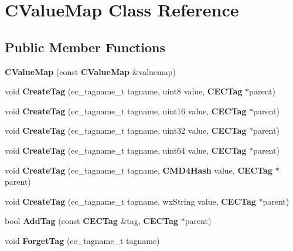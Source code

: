 \section{CValueMap Class Reference}
\label{classCValueMap}
\subsection*{Public Member Functions}
\begin{DoxyCompactItemize}
\item 
{\bfseries CValueMap} (const {\bf CValueMap} \&valuemap)\label{classCValueMap_a001e70fe2c75eee63fba998debaddc21}

\item 
void {\bfseries CreateTag} (ec\_\-tagname\_\-t tagname, uint8 value, {\bf CECTag} $\ast$parent)\label{classCValueMap_ad7d858c4427813ae2088acd160917ce2}

\item 
void {\bfseries CreateTag} (ec\_\-tagname\_\-t tagname, uint16 value, {\bf CECTag} $\ast$parent)\label{classCValueMap_a2baf08efd31561cd771116627cb2db02}

\item 
void {\bfseries CreateTag} (ec\_\-tagname\_\-t tagname, uint32 value, {\bf CECTag} $\ast$parent)\label{classCValueMap_ac12f2af93861153037357a6e6f6653bc}

\item 
void {\bfseries CreateTag} (ec\_\-tagname\_\-t tagname, uint64 value, {\bf CECTag} $\ast$parent)\label{classCValueMap_a8447adaf142d4ab9a6092538a080fc99}

\item 
void {\bfseries CreateTag} (ec\_\-tagname\_\-t tagname, {\bf CMD4Hash} value, {\bf CECTag} $\ast$parent)\label{classCValueMap_ab98a5fe5e1d9ce0991df07e3f1aa62a9}

\item 
void {\bfseries CreateTag} (ec\_\-tagname\_\-t tagname, wxString value, {\bf CECTag} $\ast$parent)\label{classCValueMap_a5d8ff87143abd9148070605cd17e14b1}

\item 
bool {\bfseries AddTag} (const {\bf CECTag} \&tag, {\bf CECTag} $\ast$parent)\label{classCValueMap_a3ddf6efe12c872b605c00c001bbdb385}

\item 
void {\bfseries ForgetTag} (ec\_\-tagname\_\-t tagname)\label{classCValueMap_a2065e5cb4660503dc728cc328fcdb7a9}

\end{DoxyCompactItemize}
